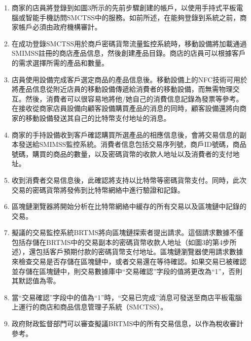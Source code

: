 		\begin{enumerate}
			\item 商家的店員將登錄到如圖3所示的先前步驟創建的帳戶，以使用手持式平板電腦或智能手機訪問SMCTSS中的服務。如前所述，在能夠登錄到系統之前，商家帳戶必須由政府機構審計。
			\item 在成功登錄SMCTSS用於商戶密碼貨幣流量監控系統時，移動設備將加載通過SMIMSS註冊的商店產品信息，然後創建產品目錄。商店的店員可以根據客戶的需求選擇所需的產品和數量。
			\item 店員使用設備完成客戶選定商品的產品信息後。移動設備上的NFC技術可用於將產品信息從附近店員的移動設備傳遞給消費者的移動設備，而無需物理交互。然後，消費者可以很容易地將他/她自己的消費信息記錄為發票等參考。在接收從商家店員設備向顧客設備購買產品的消息的同時，顧客設備還將向商家的移動設備發送其自己的比特幣支付地址的消息。
			\item 商家的手持設備收到客戶確認購買所選產品的相應信息後，會將交易信息的副本發送給SMIMSS監控系統。消費者信息包括交易序列號，商戶ID號碼，商品號碼，購買的商品的數量，以及密碼貨幣的收款人地址以及消費者的支付地址。
			\item 收到消費者交易信息後，此確認將支持以比特幣等密碼貨幣支付。同時，此次交易的密碼貨幣將發佈到比特幣網絡中進行驗證和記錄。
			\item 區塊鏈瀏覽器將開始分析在比特幣網絡中緩存的所有交易以及區塊鏈中記錄的交易。
			\item 擬議的交易監控系統BRTMS將向區塊鏈探索者提出請求。這個請求數據不僅包括存儲在BRTMS中的交易副本的密碼貨幣收款人地址（如圖3的第4步所述），還包括客戶預期付款的密碼貨幣支付地址。區塊鏈瀏覽器使用請求數據來檢查交易是否存儲在區塊鏈中，或者交易還在等待確認。如果交易已被確認並存儲在區塊鏈中，則交易數據庫中“交易確認”字段的值將更改為“1”，否則其默認值為零。
			\item 當“交易確認”字段中的值為“1”時，“交易已完成”消息可發送至商店平板電腦上運行的商店和商品信息管理子系統（SMCTSS）。
			\item 政府財政監督部門可以審查擬議BRTMS中的所有交易信息，以作為稅收審計參考。
		\end{enumerate}

	
